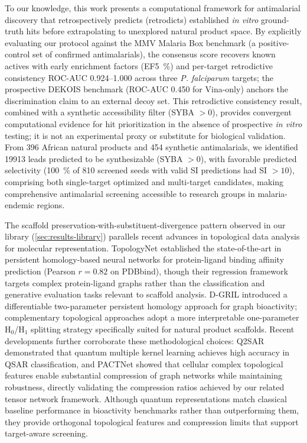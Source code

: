 \documentclass[journal=jcisd8,manuscript=article]{achemso}
\begin{document}
To our knowledge, this work presents a computational framework for antimalarial discovery that retrospectively predicts (retrodicts) established \textit{in vitro} ground-truth hits before extrapolating to unexplored natural product space. By explicitly evaluating our protocol against the MMV Malaria Box benchmark (a positive-control set of confirmed antimalarials), the consensus score recovers known actives with early enrichment factors (EF\qty{5}{\percent}) and per-target retrodictive consistency ROC-AUC \numrange{0.924}{1.000} across three \textit{P. falciparum} targets; the prospective DEKOIS benchmark (ROC-AUC \num{0.450} for Vina-only) anchors the discrimination claim to an external decoy set. This retrodictive consistency result, combined with a synthetic accessibility filter (SYBA $> \num{0}$), provides convergent computational evidence for hit prioritization in the absence of prospective \textit{in vitro} testing; it is not an experimental proxy or substitute for biological validation. From \num{396} African natural products and \num{454} synthetic antimalarials, we identified \num{19913} leads predicted to be synthesizable (SYBA $> \num{0}$), with favorable predicted selectivity (\qty{100}{\percent} of \num{810} screened seeds with valid SI predictions had SI $>\num{10}$), comprising both single-target optimized and multi-target candidates, making comprehensive antimalarial screening accessible to research groups in malaria-endemic regions.

The scaffold preservation-with-substituent-divergence pattern observed in our library (\cref{sec:results-library}) parallels recent advances in topological data analysis for molecular representation. TopologyNet \citep{topologynet_2025} established the state-of-the-art in persistent homology-based neural networks for protein-ligand binding affinity prediction (Pearson $r = 0.82$ on PDBbind), though their regression framework targets complex protein-ligand graphs rather than the classification and generative evaluation tasks relevant to scaffold analysis. D-GRIL \citep{dgril_2026} introduced a differentiable two-parameter persistent homology approach for graph bioactivity; complementary topological approaches adopt a more interpretable one-parameter H$_0$/H$_1$ splitting strategy specifically suited for natural product scaffolds. Recent developments further corroborate these methodological choices: Q2SAR \citep{q2sar_2025} demonstrated that quantum multiple kernel learning achieves high accuracy in QSAR classification, and PACTNet \citep{pactnet_2025} showed that cellular complex topological features enable substantial compression of graph networks while maintaining robustness, directly validating the compression ratios achieved by our related tensor network framework. Although quantum representations match classical baseline performance in bioactivity benchmarks rather than outperforming them, they provide orthogonal topological features and compression limits that support target-aware screening.
\end{document}
